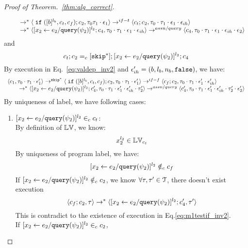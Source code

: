 \begin{proof}[Proof of Theorem.~\ref{thm:alg_correct}]
\begin{case}
\begin{subcase}
\begin{subsubcase}
\begin{subsubsubcase}
\begin{subproof}
\[\begin{array}{l}
  \qquad \rightarrow^{*} 
  \langle \;\mathtt{if}\; ([b]^{l_b}, c_t, c_f);{c}_2, \mathtt{\tau}_0 \mathtt{\tau}_1 \cdot \mathtt{\epsilon}_1 \rangle 
  \rightarrow^{if-t} 
  \langle c_t;c_2, \mathtt{\tau}_0 \cdot \mathtt{\tau}_1 \cdot \mathtt{\epsilon}_1 \cdot \mathtt{\epsilon}_{ih} \rangle 
  \\
  \qquad \rightarrow^{*} 
  \langle [\mathrel{ {x}_2 \leftarrow e_2 / {\tt query}(\psi_2) }]^{l_2};{c}_4, 
  \mathtt{\tau}_0 \cdot \mathtt{\tau}_1 \cdot \mathtt{\epsilon}_1 \cdot \mathtt{\epsilon}_{ih} \rangle 
  \rightarrow^{assn/query} 
  \langle {c}_4,  \mathtt{\tau}_0 \cdot \mathtt{\tau}_1 \cdot \mathtt{\epsilon}_1 \cdot \mathtt{\epsilon}_{ih} \cdot \mathtt{\epsilon}_2 \rangle 
  \end{array}
\]
and 
\[
  c_t;c_2 =_c [\mathtt{skip}^*]; [\mathrel{ {x}_2 \leftarrow e_2 / {\tt query}(\psi_2) }]^{l_2};{c}_4
\]
%
By execution in Eq.~\ref{eq:valdep_inv2} and $\mathtt{\epsilon}_{ih}' = (b, l_b, n_b, \mathtt{false})$, we have:
\begin{equation}
\label{eq:m1testif_inv2}
  \begin{array}{l}   
  \langle c_1, \mathtt{\tau}_0 \cdot \mathtt{\tau}_1 \cdot \mathtt{\epsilon}_1' \rangle 
  \rightarrow^{\mathtt{skip}^*} 
  \langle \;\mathtt{if}\; ([b]^{l_b}, c_t, c_f); {c}_2, \mathtt{\tau}_0 \cdot \mathtt{\tau}_1 \cdot \mathtt{\epsilon}_1' \rangle 
  \rightarrow^{if-f} 
  \langle c_f;c_2, \mathtt{\tau}_0 \cdot \mathtt{\tau}_1 \cdot \mathtt{\epsilon}_1' \cdot \mathtt{\epsilon}_{ih}' \rangle 
  \\
  \qquad \rightarrow^{*} 
  \langle [\mathrel{ {x}_2 \leftarrow e_2 / {\tt query}(\psi_2) }]^{l_2};{c}_4', 
  \mathtt{\tau}_0 \cdot \mathtt{\tau}_1 \cdot \mathtt{\epsilon}_1' \cdot \mathtt{\epsilon}_{ih}' \cdot \mathtt{\tau}_2' \rangle
  \rightarrow^{assn/query} 
  \langle {c}_4',  \mathtt{\tau}_0 \cdot \mathtt{\tau}_1 \cdot \mathtt{\epsilon}_1' \cdot \mathtt{\epsilon}_{ih}' \cdot \mathtt{\tau}_2' \cdot \mathtt{\epsilon}_2' \rangle 
\end{array}
\end{equation}
%
 By uniqueness of label, we have following cases:
 \begin{enumerate}
 \item $[\mathrel{ {x}_2 \leftarrow e_2 / {\tt query}(\psi_2) }]^{l_2} \in_c c_t$:
\\
By definition of $\mathbb{LV}$, we know:
\[
  x_2^{l_2} \in \mathbb{LV}_{c_t}
\]
%
 By uniqueness of program label, we have:
 \[
 [\mathrel{ {x}_2 \leftarrow e_2 / {\tt query}(\psi_2) }]^{l_2} \notin_c c_f
 \]
 If $[\mathrel{ {x}_2 \leftarrow e_2 / {\tt query}(\psi_2) }]^{l_2} \notin_c c_2$,
we know $\forall \mathtt{\tau}, \mathtt{\tau}' \in \mathcal{T}$, there doesn't exist execution
 \[
  \langle c_f;c_2, \mathtt{\tau} \rangle \rightarrow^{*} 
  \langle [\mathrel{ {x}_2 \leftarrow e_2 / {\tt query}(\psi_2) }]^{l_2};{c}_4', \mathtt{\tau}' \rangle
 \]
 This is contradict to the existence of execution in Eq.\ref{eq:m1testif_inv2}.
 \\
 If $[\mathrel{ {x}_2 \leftarrow e_2 / {\tt query}(\psi_2) }]^{l_2} \in_c c_2$, 

\end{enumerate}
\end{subproof}
\end{subsubsubcase}
\end{subsubcase}
\end{subcase}
\end{case}
\end{proof}

